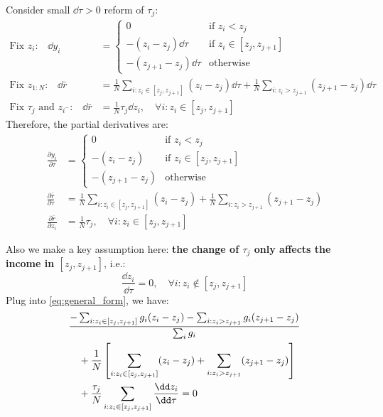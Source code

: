 Consider small $\dd\tau>0$ reform of $\tau_j$:
\begin{align*}
    \text{Fix $z_i$:} \quad \dd y_i &= \begin{cases}
      0 & \text{if $z_i < z_j$}\\
      -(z_i-z_j)\dd\tau & \text{if $z_i \in [z_j,z_{j+1}]$}\\
      - (z_{j+1}-z_j)\dd\tau & \text{otherwise}
    \end{cases} \\
    \text{Fix $z_{1:N}$:} \quad \dd\bar{r} &= \frac{1}{N}\sum_{i:z_i \in [z_j,z_{j+1}]}(z_i-z_j)\dd\tau + \frac{1}{N}\sum_{i:z_i > z_{j+1}}(z_{j+1}-z_j)\dd\tau \\
    \text{Fix $\tau_j$ and $z_{i^-}$:} \quad \dd\bar{r} &= \frac{1}{N}\tau_j\dd z_i, \quad \forall i: z_i \in [z_j,z_{j+1}]
\end{align*}
Therefore, the partial derivatives are:
\begin{align*}
    \frac{\partial y_i}{\partial \tau} &= \begin{cases}
      0 & \text{if $z_i < z_j$}\\
      -(z_i-z_j) & \text{if $z_i \in [z_j,z_{j+1}]$}\\
      - (z_{j+1}-z_j) & \text{otherwise}
    \end{cases} \\
    \frac{\partial \bar{r}}{\partial \tau} &= \frac{1}{N}\sum_{i:z_i \in [z_j,z_{j+1}]}(z_i-z_j) + \frac{1}{N}\sum_{i:z_i > z_{j+1}}(z_{j+1}-z_j) \\
    \frac{\partial \bar{r}}{\partial z_i} &= \frac{1}{N}\tau_j, \quad \forall i: z_i \in [z_j,z_{j+1}]
\end{align*}

Also we make a key assumption here: \textbf{the change of $\tau_j$ only affects the income in $[z_j,z_{j+1}]$}, i.e.:
\begin{equation*}
    \frac{\dd z_i}{\dd \tau} = 0, \quad \forall i: z_i \not\in [z_j,z_{j+1}] 
\end{equation*}
Plug into \eqref{eq:general_form}, we have:
\begin{align}
    &\frac{-\sum_{i:z_i \in [z_j,z_{j+1}]}g_i(z_i-z_j) - \sum_{i:z_i > z_{j+1}}g_i(z_{j+1}-z_j)}{\sum_i g_i} \notag \\
    &\quad + \frac{1}{N}\left[\sum_{i:z_i \in [z_j,z_{j+1}]}(z_i-z_j) + \sum_{i:z_i > z_{j+1}}(z_{j+1}-z_j)\right] \notag \\
    &\quad + \frac{\tau_j}{N} \sum_{i:z_i \in [z_j,z_{j+1}]} \frac{\dd z_i}{\dd \tau} = 0 \label{eq:pwl_income_form}
\end{align}


